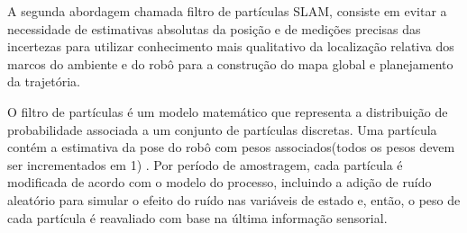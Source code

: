 A segunda abordagem chamada filtro de partículas SLAM, consiste em evitar a necessidade de estimativas absolutas da
posição e de medições precisas das incertezas para utilizar conhecimento mais qualitativo da
localização relativa dos marcos do ambiente e do robô para a construção do mapa global e
planejamento da trajetória\cite{construcaoMapas}. 

O filtro de partículas é um modelo matemático que representa a distribuição de probabilidade associada a um conjunto 
de partículas discretas. Uma partícula contém a estimativa da pose do robô com pesos associados(todos os pesos 
devem ser incrementados em 1) \cite{slam2}. Por período de amostragem, cada partícula é modificada de acordo com o
modelo do processo, incluindo a adição de ruído aleatório para simular o efeito do ruído
nas variáveis de estado e, então, o peso de cada partícula é reavaliado com base na última
informação sensorial. 

